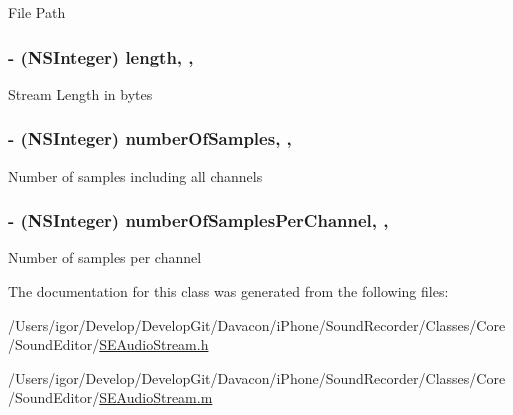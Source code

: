 File Path \hypertarget{interface_s_e_audio_stream_a54229ab240455736790dad362c5335e1}{
\subsubsection[{length}]{\setlength{\rightskip}{0pt plus 5cm}-\/ (N\-S\-Integer) length\hspace{0.3cm}{\ttfamily [read]}, {\ttfamily [nonatomic]}, {\ttfamily [assign]}}}\label{interface_s_e_audio_stream_a54229ab240455736790dad362c5335e1}
Stream Length in bytes \hypertarget{interface_s_e_audio_stream_a1e8d0ba4849fffe376bcf5494987c9a8}{
\subsubsection[{number\-Of\-Samples}]{\setlength{\rightskip}{0pt plus 5cm}-\/ (N\-S\-Integer) number\-Of\-Samples\hspace{0.3cm}{\ttfamily [read]}, {\ttfamily [nonatomic]}, {\ttfamily [assign]}}}\label{interface_s_e_audio_stream_a1e8d0ba4849fffe376bcf5494987c9a8}
Number of samples including all channels \hypertarget{interface_s_e_audio_stream_afac964b9badc8642c250a2234eb3c044}{
\subsubsection[{number\-Of\-Samples\-Per\-Channel}]{\setlength{\rightskip}{0pt plus 5cm}-\/ (N\-S\-Integer) number\-Of\-Samples\-Per\-Channel\hspace{0.3cm}{\ttfamily [read]}, {\ttfamily [nonatomic]}, {\ttfamily [assign]}}}\label{interface_s_e_audio_stream_afac964b9badc8642c250a2234eb3c044}
Number of samples per channel 

The documentation for this class was generated from the following files\-:\begin{DoxyCompactItemize}
\item 
/\-Users/igor/\-Develop/\-Develop\-Git/\-Davacon/i\-Phone/\-Sound\-Recorder/\-Classes/\-Core/\-Sound\-Editor/\hyperlink{_s_e_audio_stream_8h}{S\-E\-Audio\-Stream.\-h}\item 
/\-Users/igor/\-Develop/\-Develop\-Git/\-Davacon/i\-Phone/\-Sound\-Recorder/\-Classes/\-Core/\-Sound\-Editor/\hyperlink{_s_e_audio_stream_8m}{S\-E\-Audio\-Stream.\-m}\end{DoxyCompactItemize}
